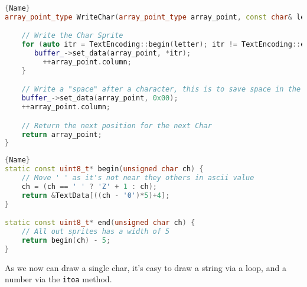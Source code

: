 \noindent\begin{minipage}[t]{.45\textwidth}
\begin{lstlisting}[caption={Drawing a Char},label={lst:draw_char},frame=tlrb, language=C++]{Name}
array_point_type WriteChar(array_point_type array_point, const char& letter){

    // Write the Char Sprite
    for (auto itr = TextEncoding::begin(letter); itr != TextEncoding::end(letter); --itr) {
  	   buffer_->set_data(array_point, *itr);
  		 ++array_point.column;
  	}

    // Write a "space" after a character, this is to save space in the TextData array
    buffer_->set_data(array_point, 0x00);
  	++array_point.column;

    // Return the next position for the next Char
  	return array_point;
}
\end{lstlisting}
\end{minipage}\hfill
\begin{minipage}[t]{.45\textwidth}
\begin{lstlisting}[caption={Calculating Sprite Location},label={lst:sprite_location},frame=tlrb, language=C++]{Name}
static const uint8_t* begin(unsigned char ch) {
    // Move ' ' as it's not near they others in ascii value
    ch = (ch == ' ' ? 'Z' + 1 : ch);
    return &TextData[((ch - '0')*5)+4];
}

static const uint8_t* end(unsigned char ch) {
    // All out sprites has a width of 5
    return begin(ch) - 5;
}
\end{lstlisting}
\end{minipage}

As we now can draw a single char, it's easy to draw a string via a loop, and a number via the \texttt{itoa} method.
